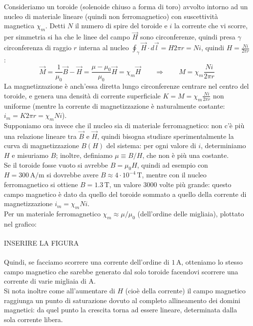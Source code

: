 Consideriamo un toroide (solenoide chiuso a forma di toro) avvolto intorno ad un nucleo di materiale lineare (quindi non ferromagnetico) con suscettività magnetica $ \chi_m $. Detti $ N $ il numero di spire del toroide e $ i $ la corrente che vi scorre, per simmetria si ha che le linee del campo $ \vec{H} $ sono circonferenze, quindi presa $ \gamma $ circonferenza di raggio $ r $ interna al nucleo $ \oint_{\gamma} \vec{H} \cdot d\vec{l} = H 2\pi r = N i $, quindi $ H = \frac{N i}{2\pi r} $:
\begin{equation}
	\vec{M} = \frac{1}{\mu_0} \vec{B} - \vec{H} = \frac{\mu - \mu_0}{\mu_0} \vec{H} = \chi_m \vec{H} \qquad\Longrightarrow\qquad M = \chi_m \frac{Ni}{2\pi r}
	\label{eq:28}
\end{equation}
La magnetizzazione è anch'essa diretta lungo circonferenze centrare nel centro del toroide, e genera una densità di corrente superficiale $ K = M = \chi_m \frac{N i}{2\pi r} $ non uniforme (mentre la corrente di magnetizzazione è naturalmente costante: $ i_m = K 2\pi r = \chi_m N i $). \\ 
%
Supponiamo ora invece che il nucleo sia di materiale ferromagnetico: non c'è più una relazione lineare tra $ \vec{B} $ e $ \vec{H} $, quindi bisogna studiare sperimentalmente la curva di magnetizzazione $ B(H) $ del sistema: per ogni valore di $ i $, determiniamo $ H $ e misuriamo $ B $; inoltre, definiamo $ \mu \equiv B / H $, che non è più una costante. \\ 
%
Se il toroide fosse vuoto si avrebbe $ B = \mu_0 H $, quindi ad esempio con $ H = 300 \,\text{A/m} $ si dovrebbe avere $ B \approx 4 \cdot 10^{-4} \,\text{T} $, mentre con il nucleo ferromagnetico si ottiene $ B = 1.3 \,\text{T} $, un valore $ 3000 $ volte più grande: questo campo magnetico è dato da quello del toroide sommato a quello della corrente di magnetizzazione $ i_m = \chi_m N i $. \\ 
%
Per un materiale ferromagnetico $ \chi_m \approx \mu / \mu_0 $ (dell'ordine delle migliaia), plottato nel grafico: \\ 
%
%
%
\hbox{}\\ INSERIRE LA FIGURA\\ \hbox{}\\ 
%
%
%
Quindi, se facciamo scorrere una corrente dell'ordine di $ 1\,\text{A} $, otteniamo lo stesso campo magnetico che sarebbe generato dal solo toroide facendovi scorrere una corrente di varie migliaia di $ \text{A} $. \\ 
Si nota inoltre come all'aumentare di $ H $ (cioè della corrente) il campo magnetico raggiunga un punto di saturazione dovuto al completo allineamento dei domini magnetici: da quel punto la crescita torna ad essere lineare, determinata dalla sola corrente libera. \\ 

